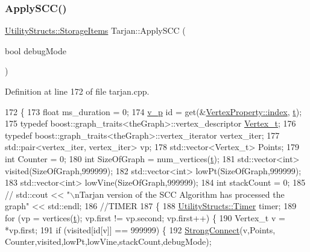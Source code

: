 \subsubsection{\texorpdfstring{Apply\+S\+C\+C()}{ApplySCC()}}
{\footnotesize\ttfamily \hyperlink{struct_utility_structs_1_1_storage_items}{Utility\+Structs\+::\+Storage\+Items} Tarjan\+::\+Apply\+S\+CC (\begin{DoxyParamCaption}\item[{bool}]{debug\+Mode }\end{DoxyParamCaption})}



Definition at line 172 of file tarjan.\+cpp.


\begin{DoxyCode}
172                                                           \{
173     \textcolor{keywordtype}{float} ms\_duration = 0;
174     \hyperlink{utilities_8h_a3f4959b3d837fa6351a9414c79280286}{v\_p} \textcolor{keywordtype}{id} = \textcolor{keyword}{get}(&\hyperlink{struct_utility_structs_1_1_vertex_property_a636cb729438e999aa3d9a17ac39d8641}{VertexProperty::index}, \hyperlink{class_tarjan_a54b0703f885a3514ea0bf4cdbc7fdaad}{t});
175     \textcolor{keyword}{typedef} boost::graph\_traits<theGraph>::vertex\_descriptor \hyperlink{class_graph_component_ae67114a6ce5a001dc35e1996e1b45aa0}{Vertex\_t};
176     \textcolor{keyword}{typedef} boost::graph\_traits<theGraph>::vertex\_iterator vertex\_iter;
177     std::pair<vertex\_iter, vertex\_iter> vp;
178     std::vector<Vertex\_t> Points;
179     \textcolor{keywordtype}{int} Counter = 0;
180     \textcolor{keywordtype}{int} SizeOfGraph = num\_vertices(\hyperlink{class_tarjan_a54b0703f885a3514ea0bf4cdbc7fdaad}{t});
181     std::vector<int> visited(SizeOfGraph,999999);
182     std::vector<int> lowPt(SizeOfGraph,999999);
183     std::vector<int> lowVine(SizeOfGraph,999999);
184     \textcolor{keywordtype}{int} stackCount = 0;
185    \textcolor{comment}{// std::cout << "\(\backslash\)nTarjan version of the SCC Algorithm has processed the graph" << std::endl;}
186     \textcolor{comment}{//TIMER}
187     \{
188         \hyperlink{class_utility_structs_1_1_timer}{UtilityStructs::Timer} timer;
189     \textcolor{keywordflow}{for} (vp = vertices(\hyperlink{class_tarjan_a54b0703f885a3514ea0bf4cdbc7fdaad}{t}); vp.first != vp.second; vp.first++) \{
190         Vertex\_t v = *vp.first;
191         \textcolor{keywordflow}{if} (visited[\textcolor{keywordtype}{id}[v]] == 999999) \{
192             \hyperlink{class_tarjan_ac76fd1419a2de2dbf34c6ff1d4cc55e2}{StrongConnect}(v,Points, Counter,visited,lowPt,lowVine,stackCount,debugMode);

\end{DoxyCode}
